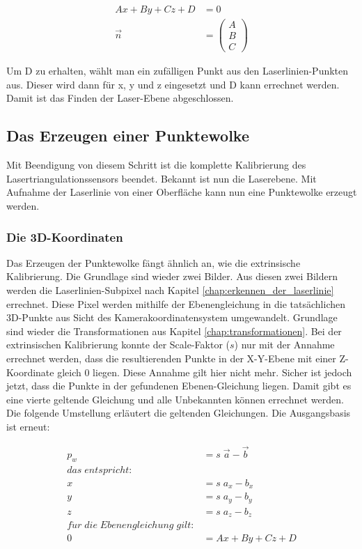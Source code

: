		\begin{equation}
			\begin{aligned}
				Ax + By +Cz +D &= 0 \\
				\vec{n} &= \begin{pmatrix}
				A \\
				B \\
				C
				\end{pmatrix}
			\end{aligned}
		\end{equation}
		
		Um D zu erhalten, wählt man ein zufälligen Punkt aus den Laserlinien-Punkten aus. Dieser wird dann für x, y und z eingesetzt und D kann errechnet werden. Damit ist das Finden der Laser-Ebene abgeschlossen. 
		\label{chap:kalibrierung_extrinsisch}
		\newpage
		
	\subsection{Das Erzeugen einer Punktewolke}
	Mit Beendigung von diesem Schritt ist die komplette Kalibrierung des Lasertriangulationssensors beendet. Bekannt ist nun die Laserebene. Mit Aufnahme der Laserlinie von einer Oberfläche kann nun eine Punktewolke erzeugt werden.
		\subsubsection{Die 3D-Koordinaten}
	Das Erzeugen der Punktewolke fängt ähnlich an, wie die extrinsische Kalibrierung. Die Grundlage sind wieder zwei Bilder. Aus diesen zwei Bildern werden die Laserlinien-Subpixel nach Kapitel \ref{chap:erkennen_der_laserlinie} errechnet. Diese Pixel werden mithilfe der Ebenengleichung in die tatsächlichen 3D-Punkte aus Sicht des Kamerakoordinatensystem umgewandelt. Grundlage sind wieder die Transformationen aus Kapitel \ref{chap:transformationen}. Bei der extrinsischen Kalibrierung konnte der Scale-Faktor (\( s \)) nur mit der Annahme errechnet werden, dass die resultierenden Punkte in der X-Y-Ebene mit einer Z-Koordinate gleich 0 liegen. Diese Annahme gilt hier nicht mehr. Sicher ist jedoch jetzt, dass die Punkte in der gefundenen Ebenen-Gleichung liegen. Damit gibt es eine vierte geltende Gleichung und alle Unbekannten können errechnet werden. Die folgende Umstellung erläutert die geltenden Gleichungen. Die Ausgangsbasis ist erneut:
	
	\begin{equation}
		\begin{aligned}
			p_w &= s \; \vec{a} - \vec{b} \\
			das \; entspricht: \\
			x &= s \; a_x - b_x \\
			y &= s \; a_y - b_y \\
			z &= s \; a_z - b_z \\
			f\ddot{u}r \; die \; Ebenengleichung \; gilt: \\
			0 &= Ax + By + Cz + D \\
		\end{aligned}
	\end{equation}
	
